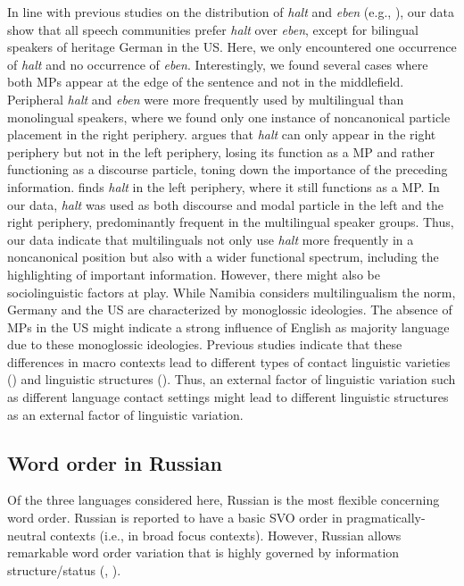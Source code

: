 \documentclass[output=paper,colorlinks,citecolor=brown]{langscibook}
\begin{document}
In line with previous studies on the distribution of \textit{halt} and \textit{eben} (e.g., \cite{elspas_zum_2005}), our data show that all speech communities prefer \textit{halt} over \textit{eben}, except for bilingual speakers of heritage German in the US. Here, we only encountered one occurrence of \textit{halt} and no occurrence of \textit{eben}. Interestingly, we found several cases where both MPs appear at the edge of the sentence and not in the middlefield. Peripheral \textit{halt} and \textit{eben} were more frequently used by multilingual than monolingual speakers, where we found only one instance of noncanonical particle placement in the right periphery. \citet{thurmair_zur_2020} argues that \textit{halt} can only appear in the right periphery but not in the left periphery, losing its function as a MP and rather functioning as a discourse particle, toning down the importance of the preceding information. \citet{imo_individuelle_2008} finds \textit{halt} in the left periphery, where it still functions as a MP. In our data, \textit{halt} was used as both discourse and modal particle in the left and the right periphery, predominantly frequent in the multilingual speaker groups. Thus, our data indicate that multilinguals not only use \textit{halt} more frequently in a noncanonical position but also with a wider functional spectrum, including the highlighting of important information. However, there might also be sociolinguistic factors at play. While Namibia considers multilingualism the norm, Germany and the US are characterized by monoglossic ideologies. The absence of MPs in the US might indicate a strong influence of English as majority language due to these monoglossic ideologies. Previous studies indicate that these differences in macro contexts lead to different types of contact linguistic varieties (\cite{wiese_heritage_2022}) and linguistic structures (\cite{bunk_sociolinguistic_nodate, bunk_bare_nodate}). Thus, an external factor of linguistic variation such as different language contact settings might lead to different linguistic structures as an external factor of linguistic variation. 


\subsection{Word order in Russian}\largerpage

Of the three languages considered here, Russian is the most flexible concerning word order. Russian is reported to have a basic SVO order in pragmatically-neutral contexts (i.e., in broad focus contexts). However, Russian allows remarkable word order variation that is highly governed by information structure/status (\cite{svedova_russkaja_1980, kovtunova_sovremennyj_2002, sirotinina_porjadok_2003, kallestinova_aspects_2007, slioussar_grammar_2007}, \citeyear{slioussar_processing_2011, bailyn_syntax_2012}).
\end{document}
